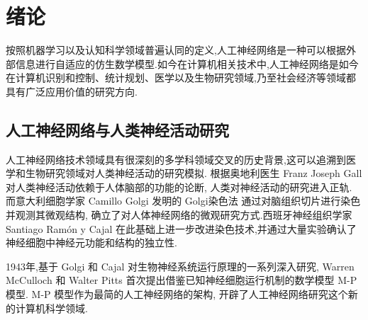 

\chapter{绪论}

按照机器学习以及认知科学领域普遍认同的定义,人工神经网络是一种可以根据外部信息进行自适应的仿生数学模型.如今在计算机相关技术中,人工神经网络是如今在计算机识别和控制、统计规划、医学以及生物研究领域,乃至社会经济等领域都具有广泛应用价值的研究方向.

\section{人工神经网络与人类神经活动研究}


人工神经网络技术领域具有很深刻的多学科领域交叉的历史背景,这可以追溯到医学和生物研究领域对人类神经活动的研究模拟. 根据奥地利医生 Franz Joseph Gall 对人类神经活动依赖于人体脑部的功能的论断, 人类对神经活动的研究进入正轨. 而意大利细胞学家 Camillo Golgi 发明的 Golgi染色法 通过对脑组织切片进行染色并观测其微观结构, 确立了对人体神经网络的微观研究方式.西班牙神经组织学家 Santiago Ramón y Cajal 在此基础上进一步改进染色技术,并通过大量实验确认了神经细胞中神经元功能和结构的独立性.

1943年,基于 Golgi 和 Cajal 对生物神经系统运行原理的一系列深入研究, Warren McCulloch 和 Walter Pitts 首次提出借鉴已知神经细胞运行机制的数学模型 M-P 模型. M-P 模型作为最简的人工神经网络的架构, 开辟了人工神经网络研究这个新的计算机科学领域.

